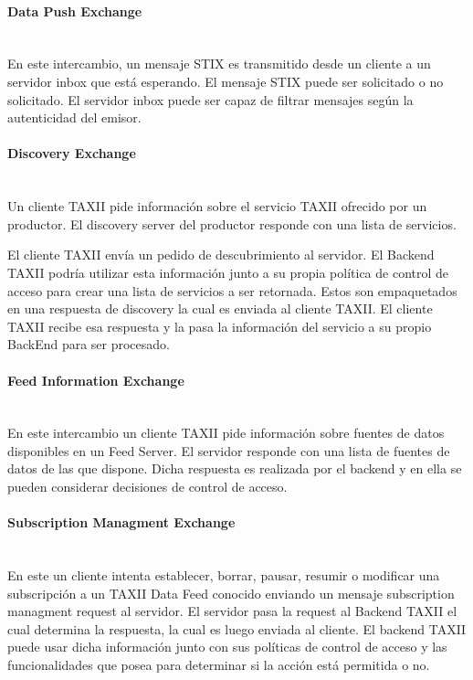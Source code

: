 \paragraph{Data Push Exchange}\ \\
En este intercambio, un mensaje STIX es transmitido desde un cliente a un 
servidor inbox que está esperando. El mensaje STIX puede ser solicitado o no 
solicitado. El servidor inbox puede ser capaz de filtrar mensajes según la 
autenticidad del emisor.

\paragraph{Discovery Exchange}\ \\

Un cliente TAXII pide información sobre el servicio TAXII ofrecido por un 
productor. El discovery server del productor responde con una lista de 
servicios. 

El cliente TAXII envía un pedido de descubrimiento al servidor. El Backend TAXII podría utilizar esta 
información junto a su propia política de control de acceso  para crear una 
lista de servicios a ser retornada. Estos son empaquetados en una 
respuesta de discovery la cual es enviada al cliente TAXII. El 
cliente TAXII recibe esa respuesta y la pasa la información del servicio a su 
propio BackEnd para ser procesado.

\paragraph{Feed Information Exchange}\ \\

En este intercambio un cliente TAXII pide información sobre fuentes de datos disponibles en 
un Feed Server. El servidor responde con una lista de fuentes de datos 
de las que dispone. Dicha respuesta es realizada por el backend y en ella se pueden considerar decisiones de control de acceso.\\

\paragraph{Subscription Managment Exchange}\ \\

En este un cliente intenta establecer, borrar, pausar, resumir o modificar una 
subscripción a un TAXII Data Feed conocido enviando un mensaje subscription 
managment request al servidor. El servidor pasa la request al Backend TAXII el 
cual determina la respuesta, la cual es luego enviada al cliente.
El backend TAXII puede usar dicha información junto con sus 
políticas de control de acceso y las funcionalidades que posea para determinar 
si la acción está permitida o no.


